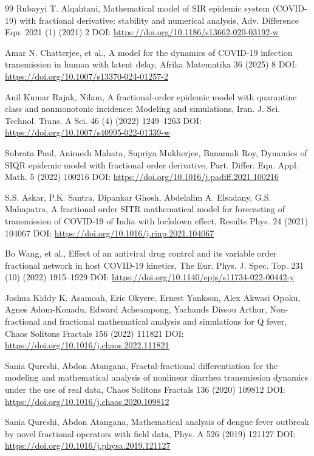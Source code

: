 \documentclass[10pt]{NSP1}
\begin{document}
\begin{thebibliography}{99}
Rubayyi T. Alqahtani, Mathematical model of SIR epidemic system (COVID-19) with fractional derivative: stability and numerical analysis, Adv. Difference Equ. 2021 (1) (2021) 2 DOI: \url{https://doi.org/10.1186/s13662-020-03192-w}

Amar N. Chatterjee, et al., A model for the dynamics of COVID-19 infection transmission in human with latent delay, Afrika Matematika 36 (2025) 8 DOI: \url{https://doi.org/10.1007/s13370-024-01257-2}

Anil Kumar Rajak, Nilam, A fractional-order epidemic model with quarantine class and nonmonotonic incidence: Modeling and simulations, Iran. J. Sci. Technol. Trans. A Sci. 46 (4) (2022) 1249--1263 DOI: \url{https://doi.org/10.1007/s40995-022-01339-w}

Subrata Paul, Animesh Mahata, Supriya Mukherjee, Banamali Roy, Dynamics of SIQR epidemic model with fractional order derivative, Part. Differ. Equ. Appl. Math. 5 (2022) 100216 DOI: \url{https://doi.org/10.1016/j.padiff.2021.100216}

S.S. Askar, P.K. Santra, Dipankar Ghosh, Abdelalim A. Elsadany, G.S. Mahapatra, A fractional order SITR mathematical model for forecasting of transmission of COVID-19 of India with lockdown effect, Results Phys. 24 (2021) 104067 DOI: \url{https://doi.org/10.1016/j.rinp.2021.104067}

Bo Wang, et al., Effect of an antiviral drug control and its variable order fractional network in host COVID-19 kinetics, The Eur. Phys. J. Spec. Top. 231 (10) (2022) 1915--1929 DOI: \url{https://doi.org/10.1140/epjs/s11734-022-00442-y}

Joshua Kiddy K. Asamoah, Eric Okyere, Ernest Yankson, Alex Akwasi Opoku, Agnes Adom-Konadu, Edward Acheampong, Yarhands Dissou Arthur, Non-fractional and fractional mathematical analysis and simulations for Q fever, Chaos Solitons Fractals 156 (2022) 111821 DOI: \url{https://doi.org/10.1016/j.chaos.2022.111821}

Sania Qureshi, Abdon Atangana, Fractal-fractional differentiation for the modeling and mathematical analysis of nonlinear diarrhea transmission dynamics under the use of real data, Chaos Solitons Fractals 136 (2020) 109812 DOI: \url{https://doi.org/10.1016/j.chaos.2020.109812}

Sania Qureshi, Abdon Atangana, Mathematical analysis of dengue fever outbreak by novel fractional operators with field data, Phys. A 526 (2019) 121127 DOI: \url{https://doi.org/10.1016/j.physa.2019.121127}


\end{thebibliography}
\end{document}
